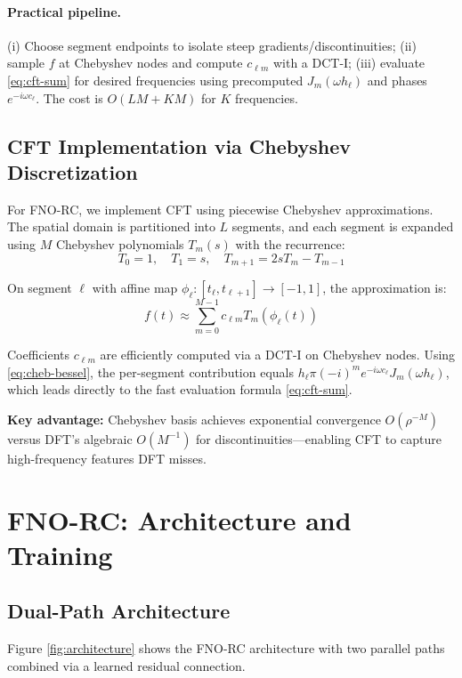 \documentclass[11pt]{article}
\begin{document}
\paragraph{Practical pipeline.} (i) Choose segment endpoints to isolate steep gradients/discontinuities; (ii) sample $f$ at Chebyshev nodes and compute $c_{\ell m}$ with a DCT-I; (iii) evaluate \eqref{eq:cft-sum} for desired frequencies using precomputed $J_m(\omega h_\ell)$ and phases $e^{-i\omega c_\ell}$. The cost is $O(LM+KM)$ for $K$ frequencies.

\subsection{CFT Implementation via Chebyshev Discretization}

For FNO-RC, we implement CFT using piecewise Chebyshev approximations. The spatial domain is partitioned into $L$ segments, and each segment is expanded using $M$ Chebyshev polynomials $T_m(s)$ with the recurrence:
\begin{equation}
T_0=1, \quad T_1=s, \quad T_{m+1} = 2sT_m - T_{m-1}
\end{equation}

On segment $\ell$ with affine map $\phi_\ell: [t_\ell, t_{\ell+1}] \to [-1,1]$, the approximation is:
\begin{equation}
f(t) \approx \sum_{m=0}^{M-1} c_{\ell m} T_m(\phi_\ell(t))
\end{equation}

Coefficients $c_{\ell m}$ are efficiently computed via a DCT-I on Chebyshev nodes. Using \eqref{eq:cheb-bessel}, the per-segment contribution equals $h_\ell \pi (-i)^m e^{-i\omega c_\ell} J_m(\omega h_\ell)$, which leads directly to the fast evaluation formula \eqref{eq:cft-sum}.

\textbf{Key advantage:} Chebyshev basis achieves exponential convergence $O(\rho^{-M})$ versus DFT's algebraic $O(M^{-1})$ for discontinuities—enabling CFT to capture high-frequency features DFT misses.

\section{FNO-RC: Architecture and Training}

\subsection{Dual-Path Architecture}

Figure \ref{fig:architecture} shows the FNO-RC architecture with two parallel paths combined via a learned residual connection.
\end{document}
